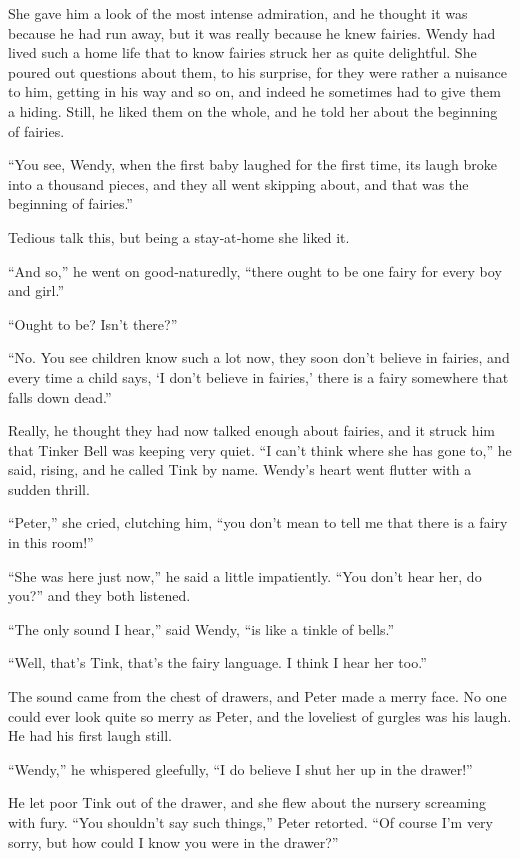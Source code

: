 She gave him a look of the most intense admiration,
and he thought it was because he had run away,
but it was really because he knew fairies.
Wendy had lived such a home life that to know fairies struck her as quite delightful.
She poured out questions about them, to his surprise,
for they were rather a nuisance to him, getting in his way and so on,
and indeed he sometimes had to give them a hiding.
Still, he liked them on the whole, and he told her about the beginning of fairies.

“You see, Wendy, when the first baby laughed for the first time, its laugh broke into a thousand pieces,
and they all went skipping about, and that was the beginning of fairies.”

Tedious talk this, but being a stay‐at‐home she liked it.

“And so,” he went on good‐naturedly, “there ought to be one fairy for every boy and girl.”

“Ought to be?
Isn’t there?”

“No.
You see children know such a lot now, they soon don’t believe in fairies,
and every time a child says, ‘I don’t believe in fairies,’ there is a fairy somewhere that falls down dead.”

Really, he thought they had now talked enough about fairies,
and it struck him that Tinker Bell was keeping very quiet.
“I can’t think where she has gone to,” he said, rising, and he called Tink by name.
Wendy’s heart went flutter with a sudden thrill.

“Peter,” she cried, clutching him,
“you don’t mean to tell me that there is a fairy in this room!”

“She was here just now,” he said a little impatiently.
“You don’t hear her, do you?\@” and they both listened.

“The only sound I hear,” said Wendy, “is like a tinkle of bells.”

“Well, that’s Tink, that’s the fairy language.
I think I hear her too.”

The sound came from the chest of drawers, and Peter made a merry face.
No one could ever look quite so merry as Peter, and the loveliest of gurgles was his laugh.
He had his first laugh still.

“Wendy,” he whispered gleefully, “I do believe I shut her up in the drawer!”

He let poor Tink out of the drawer, and she flew about the nursery screaming with fury.
“You shouldn’t say such things,” Peter retorted.
“Of course I’m very sorry, but how could I know you were in the drawer?”

